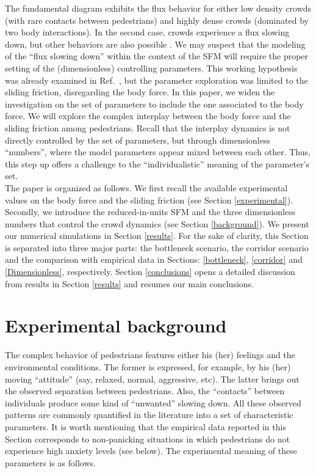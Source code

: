 \documentclass[preprint,12pt]{elsarticle}
\begin{document}
The fundamental diagram exhibits the flux behavior for either low density crowds
(with rare contacts between pedestrians) and highly dense crowds (dominated  by
two body interactions). In the second case, crowds experience a flux  slowing
down, but other behaviors are also possible \cite{helbing_2007,lohner_2018}. We
may suspect that the  modeling of the  ``flux slowing down'' within the context
of the SFM will require the proper  setting of the (dimensionless) controlling
parameters. This working hypothesis was already examined in
Ref.~\cite{dorso_2019}, but the parameter exploration was limited to  the
sliding friction, disregarding the body force. In this paper, we widen the
investigation on the set of parameters to include the one  associated to the
body force. We will explore   the complex interplay between  the body force and
the sliding friction among pedestrians. Recall that the  interplay dynamics is
not directly controlled by the set of parameters, but  through dimensionless
``numbers'', where the model parameters appear mixed  between each other. Thus,
this step up offers a challenge to the  ``individualistic'' meaning of the
parameter's set. \\


The paper is organized as follows. We first recall the available  experimental
values on the body force and the sliding friction (see Section
\ref{experimental}). Secondly, we introduce the reduced-in-units SFM and the
three dimensionless numbers that control the crowd dynamics (see Section
\ref{background}). We present our numerical simulations in Section
\ref{results}. For the sake of clarity, this Section is  separated into three
major parts: the bottleneck scenario, the corridor scenario and the comparison
with empirical data in Sections: \ref{bottleneck}, \ref{corridor} and
\ref{Dimensionless}, respectively.  Section \ref{conclusions} opens a detailed
discussion from results in Section \ref{results} and resumes our main
conclusions.

\section{\label{experimental}Experimental background}

The complex behavior of pedestrians features  either his (her) feelings and  the
environmental conditions. The former is expressed, for example, by his  (her)
moving ``attitude'' (say, relaxed, normal, aggressive, etc). The latter brings
out the  observed separation between pedestrians. Also, the ``contacts'' between
individuals produce some kind of ``unwanted'' slowing down. All these  observed
patterns are commonly quantified in the literature into a set of  characteristic
parameters. It is worth mentioning that the empirical data reported in this
Section corresponds to non-panicking situations in which pedestrians  do not
experience high anxiety levels (see below).  The experimental meaning of these
parameters is as follows.
\end{document}
